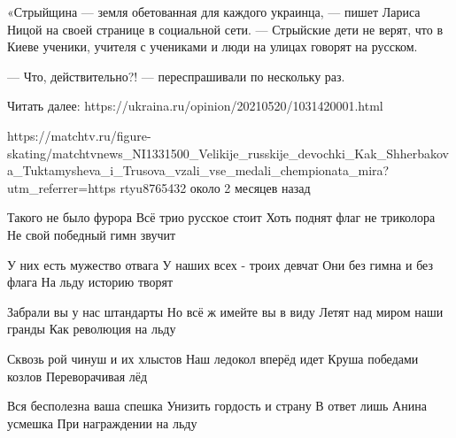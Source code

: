 
«Стрыйщина — земля обетованная для каждого украинца, — пишет Лариса Ницой на своей странице в социальной сети. — Стрыйские дети не верят, что в Киеве ученики, учителя с учениками и люди на улицах говорят на русском.

— Что, действительно?! — переспрашивали по нескольку раз.

Читать далее: https://ukraina.ru/opinion/20210520/1031420001.html

https://matchtv.ru/figure-skating/matchtvnews_NI1331500_Velikije_russkije_devochki_Kak_Shherbakova_Tuktamysheva_i_Trusova_vzali_vse_medali_chempionata_mira?utm_referrer=https%
rtyu8765432
около 2 месяцев назад

Такого не было фурора
Всё трио русское стоит
Хоть поднят флаг не триколора
Не свой победный гимн звучит

У них есть мужество отвага
У наших всех - троих девчат
Они без гимна и без флага
На льду историю творят

Забрали вы у нас штандарты
Но всё ж имейте вы в виду
Летят над миром наши гранды
Как революция на льду

Сквозь рой чинуш и их хлыстов
Наш ледокол вперёд идет
Круша победами козлов
Переворачивая лёд

Вся бесполезна ваша спешка
Унизить гордость и страну
В ответ лишь Анина усмешка
При награждении на льду


